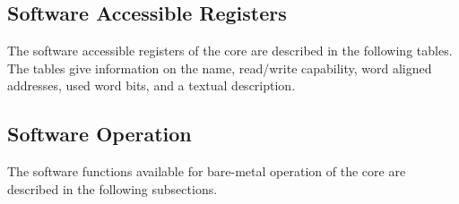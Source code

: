 \subsection{Software Accessible Registers}
\label{sec:swreg}

The software accessible registers of the core are described in the following
tables. The tables give information on the name, read/write capability, word 
aligned addresses, used word bits, and a textual description.




\subsection{Software Operation}
\label{sec:swop}

The software functions available for bare-metal operation of the core are
described in the following subsections.



